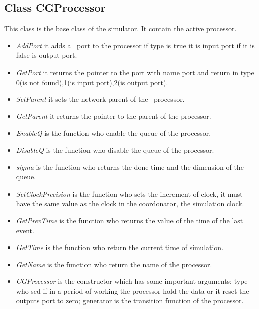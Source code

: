 \documentclass[a4paper,oneside,notitlepage]{article}
\begin{document}
\subsection{Class CGProcessor}

This class is the base class of the simulator. It contain the active
processor.

\begin{itemize}
\item \textit{AddPort} it adds a \ port to the processor if type is true it
is input port if it is false is output port.

\item \textit{GetPort} it returns the pointer to the port with name port and
return in type 0(is not found),1(is input port),2(is output port).

\item \textit{SetParent} it sets the network parent of the \ processor.

\item \textit{GetParent} it returns the pointer to the parent of the
processor.

\item \textit{EnableQ} is the function who enable the queue of the processor.

\item \textit{DisableQ} is the function who disable the queue of the
processor.

\item \textit{sigma} is the function who returns the done time and the
dimension of the queue.

\item \textit{SetClockPrecision} is the function who sets the increment of
clock, it must have the same value as the clock in the coordonator, the
simulation clock.

\item \textit{GetPrevTime} is the function who returns the value of the time
of the last event.

\item \textit{GetTime} is the function who return the current time of
simulation.

\item \textit{GetName} is the function who return the name of the processor.

\item \textit{CGProcessor} is the constructor which has some important
arguments: type who sed if in a period of working the processor hold the
data or it reset the outputs port to zero; generator is the transition
function of the processor.


\end{itemize}
\end{document}
